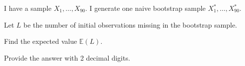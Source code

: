 
\begin{question}
I have a sample \(X_1, \ldots, X_{90}\).
I generate one naive bootstrap sample \(X^*_1, \ldots, X^*_{90}\).

Let \(L\) be the number of initial observations missing in the bootstrap sample.

Find the expected value \(\mathbb{E}(L)\).

Provide the answer with 2 decimal digits.
\end{question}


